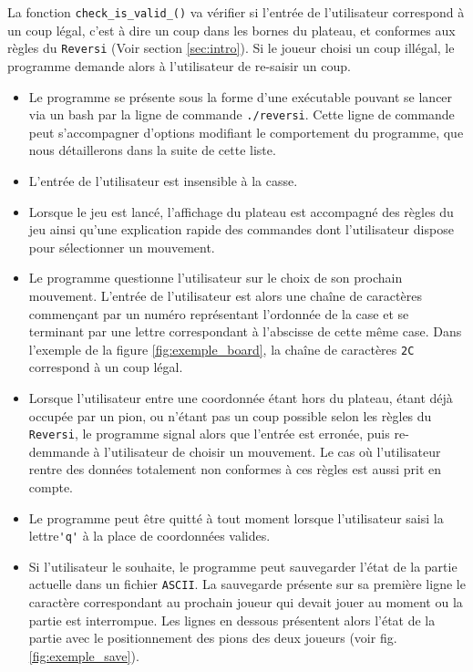 \documentclass[10pt,a4paper]{article}
\begin{document}
La fonction \verb!check_is_valid_()! va vérifier si l'entrée de l'utilisateur correspond à un coup légal, c'est à dire un coup dans les bornes du plateau, et conformes aux règles du \verb!Reversi! (Voir section \ref{sec:intro}). Si le joueur choisi un coup illégal, le programme demande alors à l'utilisateur de re-saisir un coup.\\
\begin{itemize}
\item Le programme se présente sous la forme d'une exécutable pouvant se lancer via un bash par la ligne de commande \verb!./reversi!. Cette ligne de commande peut s'accompagner d'options modifiant le comportement du programme, que nous détaillerons dans la suite de cette liste.
\item L'entrée de l'utilisateur est insensible à la casse.
\item Lorsque le jeu est lancé, l'affichage du plateau est accompagné des règles du jeu ainsi qu'une explication rapide des commandes dont l'utilisateur dispose pour sélectionner un mouvement.
\item Le programme questionne l'utilisateur sur le choix de son prochain mouvement. L'entrée de l'utilisateur est alors une chaîne de caractères commençant par un numéro représentant l'ordonnée de la case et se terminant par une lettre correspondant à l'abscisse de cette même case. Dans l'exemple de la figure \ref{fig:exemple_board}, la chaîne de caractères \verb!2C! correspond à un coup légal.
\item Lorsque l'utilisateur entre une coordonnée étant hors du plateau, étant déjà occupée par un pion, ou n'étant pas un coup possible selon les règles du \verb!Reversi!, le programme signal alors que l'entrée est erronée, puis re-demmande à l'utilisateur de choisir un mouvement. Le cas où l'utilisateur rentre des données totalement non conformes à ces règles est aussi prit en compte.
\item Le programme peut être quitté à tout moment lorsque l'utilisateur saisi la lettre\verb!'q'! à la place de coordonnées valides.
\item Si l'utilisateur le souhaite, le programme peut sauvegarder l'état de la partie actuelle dans un fichier \verb!ASCII!. La sauvegarde présente sur sa première ligne le caractère correspondant au prochain joueur qui devait jouer au moment ou la partie est interrompue. Les lignes en dessous présentent alors l'état de la partie avec le positionnement des pions des deux joueurs (voir fig. \ref{fig:exemple_save}).

\end{itemize}
\end{document}
